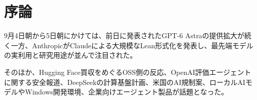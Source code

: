 \section{序論}

9月4日朝から5日朝にかけては、前日に発表されたGPT-6 Astraの提供拡大が続く一方、AnthropicがClaudeによる大規模なLean形式化を発表し、最先端モデルの実利用と研究用途が並んで注目された。

そのほか、Hugging Face買収をめぐるOSS側の反応、OpenAI評価エージェントに関する安全報道、DeepSeekの計算基盤計画、米国のAI規制案、ローカルAIモデルやWindows開発環境、企業向けエージェント製品が話題となった。


